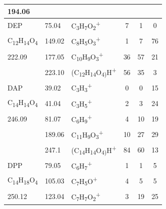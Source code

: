 {\begin{longtable}[c]{lllccc}
194.06          & &  & & & \\
\hline
DEP       & 75.04                & C\textsubscript{3}H\textsubscript{7}O\textsubscript{2}\textsuperscript{+}      & 7            & 1            & 0            \\
C\textsubscript{12}H\textsubscript{14}O\textsubscript{4}          & 149.02               & C\textsubscript{8}H\textsubscript{5}O\textsubscript{3}\textsuperscript{+}      & 1            & 7            & 76           \\
222.09          & 177.05               & C\textsubscript{10}H\textsubscript{9}O\textsubscript{3}\textsuperscript{+}     & 36           & 57           & 21           \\
          & 223.10                & (C\textsubscript{12}H\textsubscript{14}O\textsubscript{4)}H\textsuperscript{+} & 56           & 35           & 3            \\
\hline
DAP                                                      & 39.02  & C\textsubscript{3}H\textsubscript{3}\textsuperscript{+}                        & 0  & 0  & 15 \\
C\textsubscript{14}H\textsubscript{14}O\textsubscript{4} & 41.04  & C\textsubscript{3}H\textsubscript{5}\textsuperscript{+}                        & 2  & 3  & 24 \\
246.09                                                   & 81.07  & C\textsubscript{6}H\textsubscript{9}\textsuperscript{+}                        & 4  & 10 & 19 \\
                                                         & 189.06 & C\textsubscript{11}H\textsubscript{9}O\textsubscript{3}\textsuperscript{+}     & 10 & 27 & 29 \\
                                                         & 247.1  & (C\textsubscript{14}H\textsubscript{14}O\textsubscript{4)}H\textsuperscript{+} & 84 & 60 & 13\\
\hline
DPP       & 79.05                & C\textsubscript{6}H\textsubscript{7}\textsuperscript{+}                           & 1            & 1            & 5            \\
C\textsubscript{14}H\textsubscript{18}O\textsubscript{4}          & 105.03               & C\textsubscript{7}H\textsubscript{5}O\textsuperscript{+}                          & 4            & 5            & 5            \\
250.12          & 123.04               & C\textsubscript{7}H\textsubscript{7}O\textsubscript{2}\textsuperscript{+}      & 3            & 19           & 25           \\

\end{longtable}}
